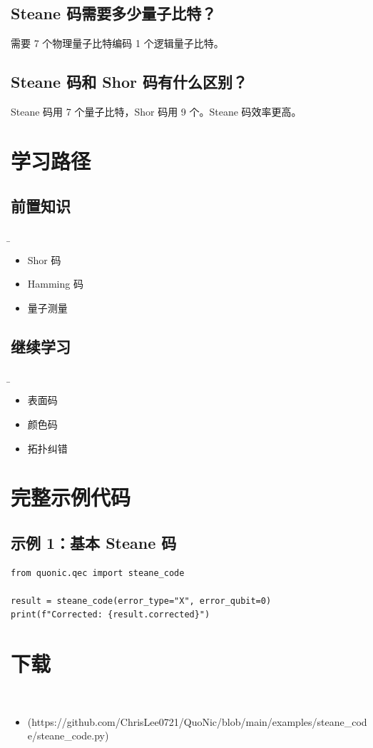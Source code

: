 \documentclass[12pt,a4paper]{article}
\begin{document}
\subsection{Steane 码需要多少量子比特？}

需要 7 个物理量子比特编码 1 个逻辑量子比特。

\subsection{Steane 码和 Shor 码有什么区别？}

Steane 码用 7 个量子比特，Shor 码用 9 个。Steane 码效率更高。

\section{学习路径}

\subsection{前置知识}
\b\begin{itemize}
  \item Shor 码
  \item Hamming 码
  \item 量子测量
\end{itemize}

\subsection{继续学习}
\b\begin{itemize}
  \item 表面码
  \item 颜色码
  \item 拓扑纠错
\end{itemize}

\section{完整示例代码}

\subsection{示例 1：基本 Steane 码}

\begin{lstlisting}[style=python]
from quonic.qec import steane_code

result = steane_code(error_type="X", error_qubit=0)
print(f"Corrected: {result.corrected}")
\end{lstlisting}


\section{下载}

\begin{itemize}
  \item [steane_code.py](https://github.com/ChrisLee0721/QuoNic/blob/main/examples/steane_code/steane_code.py)
\end{itemize}
\end{document}
